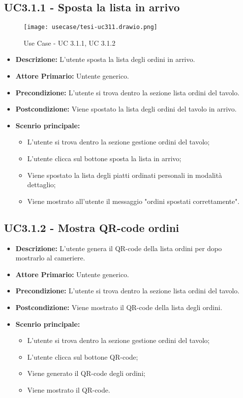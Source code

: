 \subsection{UC3.1.1 - Sposta la lista in arrivo}
\begin{figure}[H]
    \centering
    \texttt{[image: usecase/tesi-uc311.drawio.png]}
    \caption{Use Case - UC 3.1.1, UC 3.1.2}
\end{figure}
\begin{itemize}
    \item \textbf{Descrizione:} L'utente sposta la lista degli ordini in arrivo.
    \item \textbf{Attore Primario:} Untente generico.
    \item \textbf{Precondizione:} L'utente si trova dentro la sezione lista ordini del tavolo.
    \item \textbf{Postcondizione:} Viene spostato la lista degli ordini del tavolo in arrivo.
    \item \textbf{Scenrio principale:}
    \begin{itemize}
        \item L'utente si trova dentro la sezione gestione ordini del tavolo;
        \item L'utente clicca sul bottone sposta la lista in arrivo;
        \item Viene spostato la lista degli piatti ordinati personali in modalità dettaglio;
        \item Viene mostrato all'utente il messaggio "ordini spostati correttamente".
    \end{itemize}
\end{itemize}
\subsection{UC3.1.2 - Mostra QR-code ordini}
\begin{itemize}
    \item \textbf{Descrizione:} L'utente genera il QR-code della lista ordini per dopo mostrarlo al cameriere.
    \item \textbf{Attore Primario:} Untente generico.
    \item \textbf{Precondizione:} L'utente si trova dentro la sezione lista ordini del tavolo.
    \item \textbf{Postcondizione:} Viene mostrato il QR-code della lista degli ordini.
    \item \textbf{Scenrio principale:}
    \begin{itemize}
        \item L'utente si trova dentro la sezione gestione ordini del tavolo;
        \item L'utente clicca sul bottone QR-code;
        \item Viene generato il QR-code degli ordini;
        \item Viene mostrato il QR-code.
    \end{itemize}
\end{itemize}
